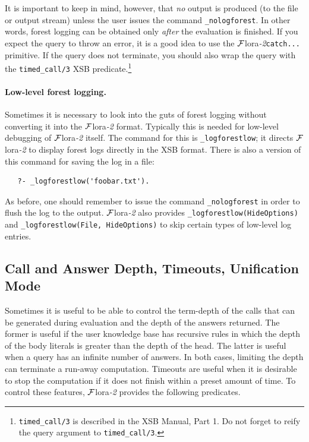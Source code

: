 \documentclass[11pt]{article}
\newcommand{\FLORA}{{\mbox{\sc ${\cal F}${lora}\rm\emph{-2}}}\xspace}
\begin{document}
It is important to keep in mind, however, that \emph{no} output
is produced (to the file or output stream) unless the user issues the command
{\tt \_nologforest}. In other words, forest logging can be obtained only
\emph{after} the evaluation is finished. 
If you expect the query to throw an error, it is a good idea to use the
\FLORA \texttt{catch{...}} primitive. If the query does not terminate,
you should also wrap the query with the \texttt{timed\_call/3} XSB predicate.\footnote{
  \texttt{timed\_call/3} is described in the XSB Manual, Part 1. Do not
  forget to reify the query argument to  \texttt{timed\_call/3}.
  }

\paragraph{Low-level forest logging.}
Sometimes it is necessary to look into the guts of forest logging without
converting it into the \FLORA format. Typically this is needed for
low-level debugging of \FLORA itself.
The command for this is
{\tt \_logforestlow}; it directs \FLORA to display forest logs 
directly in the XSB format.
There is also a version of this command for saving the log in a file:
\begin{verbatim}
   ?- _logforestlow('foobar.txt').
\end{verbatim}
As before, one should remember to issue the command \texttt{\_nologforest}
in order to flush the log to the output.
\FLORA also provides {\tt \_logforestlow(HideOptions)} and 
{\tt \_logforestlow(File, HideOptions)} to skip certain types of low-level 
log entries. 

\subsection{Call and Answer Depth, Timeouts, Unification Mode}

Sometimes it is useful to be able to control the term-depth of the calls
that can be generated during evaluation and the depth of the answers
returned. The former is useful if the user knowledge base has recursive
rules in which the depth of the body literals is greater than the depth of
the head. The latter is useful when a query has an infinite number of
answers. In both cases, limiting the depth can terminate a run-away
computation.
Timeouts are useful when it is desirable to stop the computation if it does
not finish within a preset amount of time.
To control these features, \FLORA provides the following predicates.
\end{document}
